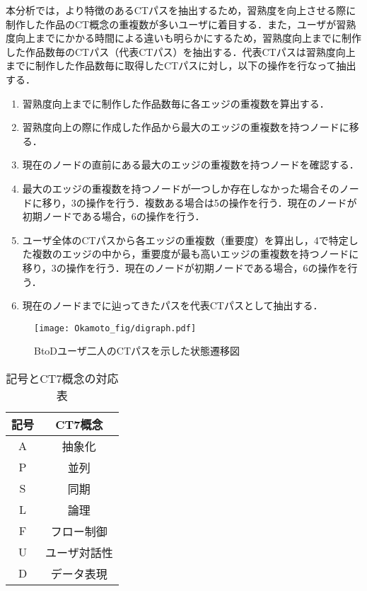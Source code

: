 \documentclass[11pt,dvipdfmx]{jreport}
\begin{document}
本分析では，より特徴のあるCTパスを抽出するため，習熟度を向上させる際に制作した作品のCT概念の重複数が多いユーザに着目する．また，ユーザが習熟度向上までにかかる時間による違いも明らかにするため，習熟度向上までに制作した作品数毎のCTパス（代表CTパス）を抽出する．代表CTパスは習熟度向上までに制作した作品数毎に取得したCTパスに対し，以下の操作を行なって抽出する．
\begin{enumerate}
    \item 習熟度向上までに制作した作品数毎に各エッジの重複数を算出する．
    \item 習熟度向上の際に作成した作品から最大のエッジの重複数を持つノードに移る．
    \item 現在のノードの直前にある最大のエッジの重複数を持つノードを確認する．
    \item 最大のエッジの重複数を持つノードが一つしか存在しなかった場合そのノードに移り，3の操作を行う．複数ある場合は5の操作を行う．現在のノードが初期ノードである場合，6の操作を行う．
    \item ユーザ全体のCTパスから各エッジの重複数（重要度）を算出し，4で特定した複数のエッジの中から，重要度が最も高いエッジの重複数を持つノードに移り，3の操作を行う．現在のノードが初期ノードである場合，6の操作を行う．
    \item 現在のノードまでに辿ってきたパスを代表CTパスとして抽出する．
\end{enumerate}



\begin{figure*}[t]
	\centering
	\texttt{[image: Okamoto\_fig/digraph.pdf]}
	\caption{BtoDユーザ二人のCTパスを示した状態遷移図}
	\label{fig:digraph}
\end{figure*}

\begin{table}
  \caption{記号とCT7概念の対応表}
  \label{tab:ct-symobol}
  \vspace{2mm}
  \centering
  \begin{tabular}{c|c}
    \hline
    記号 & CT7概念\\
    \hline
    \hline
    A & 抽象化 \\
    \hline
    P & 並列 \\
    \hline
    S & 同期 \\
    \hline
    L & 論理 \\
    \hline
    F & フロー制御 \\
    \hline
    U & ユーザ対話性 \\
    \hline
    D & データ表現 \\
    \hline
  \end{tabular}
\end{table}
\end{document}
